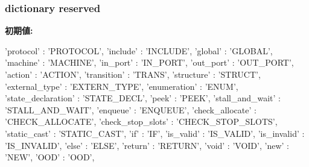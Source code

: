 \begin{DoxyVerb}
{\subsubsection[{protocol}]{}}
\label{classslicc_1_1parser_1_1SLICC_add2ec924c0f221790d7235ffb2e615cd}
\hypertarget{classslicc_1_1parser_1_1SLICC_ad52c0dc2fa8283d52eb1f3352731dd11}{
\subsubsection[{reserved}]{\setlength{\rightskip}{0pt plus 5cm}dictionary {\bf reserved}}}
\label{classslicc_1_1parser_1_1SLICC_ad52c0dc2fa8283d52eb1f3352731dd11}
{\bfseries 初期値:}
\begin{DoxyCode}
{
        'protocol' : 'PROTOCOL',
        'include' : 'INCLUDE',
        'global' : 'GLOBAL',
        'machine' : 'MACHINE',
        'in_port' : 'IN_PORT',
        'out_port' : 'OUT_PORT',
        'action' : 'ACTION',
        'transition' : 'TRANS',
        'structure' : 'STRUCT',
        'external_type' : 'EXTERN_TYPE',
        'enumeration' : 'ENUM',
        'state_declaration' : 'STATE_DECL',
        'peek' : 'PEEK',
        'stall_and_wait' : 'STALL_AND_WAIT',
        'enqueue' : 'ENQUEUE',
        'check_allocate' : 'CHECK_ALLOCATE',
        'check_stop_slots' : 'CHECK_STOP_SLOTS',
        'static_cast' : 'STATIC_CAST',
        'if' : 'IF',
        'is_valid' : 'IS_VALID',
        'is_invalid' : 'IS_INVALID',
        'else' : 'ELSE',
        'return' : 'RETURN',
        'void' : 'VOID',
        'new' : 'NEW',
        'OOD' : 'OOD',
    }
\end{DoxyCode}
\hypertarget{classslicc_1_1parser_1_1SLICC_a643766e045eab208f01ba6957b661e2a}{
\subsubsection[{symtab}]{}}
\label{classslicc_1_1parser_1_1SLICC_a643766e045eab208f01ba6957b661e2a}
\hypertarget{classslicc_1_1parser_1_1SLICC_a2e8f982a9dd053e933b76be1c8e307e1}{
}
\end{DoxyVerb}
